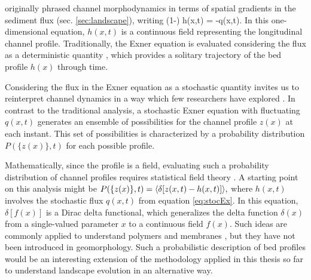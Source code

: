 \citet{Exner1925} originally phrased channel morphodynamics in terms of spatial gradients in the sediment flux (sec. \ref{sec:landscape}), writing
\be (1-\phi) \pt h(x,t) = -\px q(x,t). \label{eq:stocEx}\ee
In this one-dimensional equation, $h(x,t)$ is a continuous field representing the longitudinal channel profile.
Traditionally, the Exner equation is evaluated considering the flux as a deterministic quantity \citep{Parker2007,Viparelli2011,An2017}, which provides a solitary trajectory of the bed profile $h(x)$ through time.

Considering the flux in the Exner equation as a stochastic quantity invites us to reinterpret channel dynamics in a way which few researchers have explored \citep{Jerolmack2005,Bohorquez2016}.
In contrast to the traditional analysis, a stochastic Exner equation with fluctuating $q(x,t)$ generates an ensemble of possibilities for the channel profile $z(x)$ at each instant. This set of possibilities is characterized by a probability distribution $P(\{z(x)\},t)$ for each possible profile.

Mathematically, since the profile is a field, evaluating such a probability distribution of channel profiles requires statistical field theory \citep{Kardar2007}.
A starting point on this analysis might be $P(\{z(x)\},t) = \langle \delta[z(x,t)-h(x,t)]\rangle,$ where $h(x,t)$ involves the stochastic flux $q(x,t)$ from equation \ref{eq:stocEx}.
In this equation, $\delta[f(x)]$ is a Dirac delta functional, which generalizes the delta function $\delta(x)$ from a single-valued parameter $x$ to a continuous field $f(x)$.
Such ideas are commonly applied to understand polymers and membranes \citep{Kawakatsu2001,Nelson2004}, but they have not been introduced in geomorphology. Such a probabilistic description of bed profiles would be an interesting extension of the methodology applied in this thesis so far to understand landscape evolution in an alternative way.
